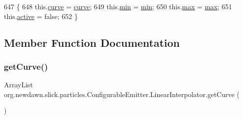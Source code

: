 \begin{DoxyCode}
647                                                                      \{
648             this.\mbox{\hyperlink{classorg_1_1newdawn_1_1slick_1_1particles_1_1_configurable_emitter_1_1_linear_interpolator_a2029dd987ff4a634d2bc06e5828852c4}{curve}} = \mbox{\hyperlink{classorg_1_1newdawn_1_1slick_1_1particles_1_1_configurable_emitter_1_1_linear_interpolator_a2029dd987ff4a634d2bc06e5828852c4}{curve}};
649             this.\mbox{\hyperlink{classorg_1_1newdawn_1_1slick_1_1particles_1_1_configurable_emitter_1_1_linear_interpolator_aa1aa9af8efa3ec59587abfb5a4831e42}{min}} = \mbox{\hyperlink{classorg_1_1newdawn_1_1slick_1_1particles_1_1_configurable_emitter_1_1_linear_interpolator_aa1aa9af8efa3ec59587abfb5a4831e42}{min}};
650             this.\mbox{\hyperlink{classorg_1_1newdawn_1_1slick_1_1particles_1_1_configurable_emitter_1_1_linear_interpolator_adc1986c1f968ccd9155e19fac44c66da}{max}} = \mbox{\hyperlink{classorg_1_1newdawn_1_1slick_1_1particles_1_1_configurable_emitter_1_1_linear_interpolator_adc1986c1f968ccd9155e19fac44c66da}{max}};
651             this.\mbox{\hyperlink{classorg_1_1newdawn_1_1slick_1_1particles_1_1_configurable_emitter_1_1_linear_interpolator_a0f28ab5311b6eaa1a406818811e39b54}{active}} = \textcolor{keyword}{false};
652         \}
\end{DoxyCode}


\subsection{Member Function Documentation}
\mbox{\label{classorg_1_1newdawn_1_1slick_1_1particles_1_1_configurable_emitter_1_1_linear_interpolator_a4fc4721a3ad6031400d77b1f672b741d}} 
\subsubsection{\texorpdfstring{get\+Curve()}{getCurve()}}
{\footnotesize\ttfamily Array\+List org.\+newdawn.\+slick.\+particles.\+Configurable\+Emitter.\+Linear\+Interpolator.\+get\+Curve (\begin{DoxyParamCaption}{ }\end{DoxyParamCaption})\hspace{0.3cm}{\ttfamily [inline]}}

